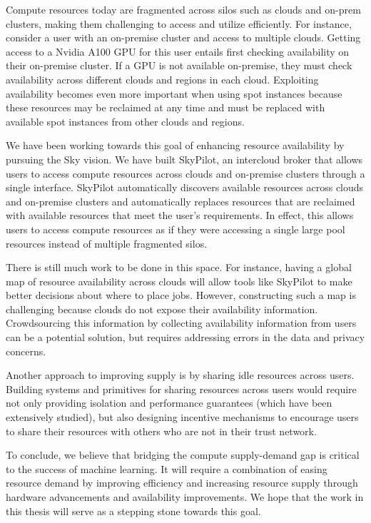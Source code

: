 Compute resources today are fragmented across silos such as clouds and on-prem clusters, making them challenging to access and utilize efficiently. For instance, consider a user with an on-premise cluster and access to multiple clouds. Getting access to a Nvidia A100 GPU for this user entails first checking availability on their on-premise cluster. If a GPU is not available on-premise, they must check availability across different clouds and regions in each cloud. Exploiting availability becomes even more important when using spot instances because these resources may be reclaimed at any time and must be replaced with available spot instances from other clouds and regions.

We have been working towards this goal of enhancing resource availability by pursuing the Sky\cite{skyhotos} vision. We have built SkyPilot\cite{skypilot}, an intercloud broker that allows users to access compute resources across clouds and on-premise clusters through a single interface. SkyPilot automatically discovers available resources across clouds and on-premise clusters and automatically replaces resources that are reclaimed with available resources that meet the user's requirements. In effect, this allows users to access compute resources as if they were accessing a single large pool resources instead of multiple fragmented silos.

There is still much work to be done in this space. For instance, having a global map of resource availability across clouds will allow tools like SkyPilot to make better decisions about where to place jobs. However, constructing such a map is challenging because clouds do not expose their availability information. Crowdsourcing this information by collecting availability information from users can be a potential solution, but requires addressing errors in the data and privacy concerns. 

Another approach to improving supply is by sharing idle resources across users. Building systems and primitives for sharing resources across users would require not only providing isolation and performance guarantees (which have been extensively studied), but also designing incentive mechanisms to encourage users to share their resources with others who are not in their trust network.

To conclude, we believe that bridging the compute supply-demand gap is critical to the success of machine learning. It will require a combination of easing resource demand by improving efficiency and increasing resource supply through hardware advancements and availability improvements. We hope that the work in this thesis will serve as a stepping stone towards this goal.

